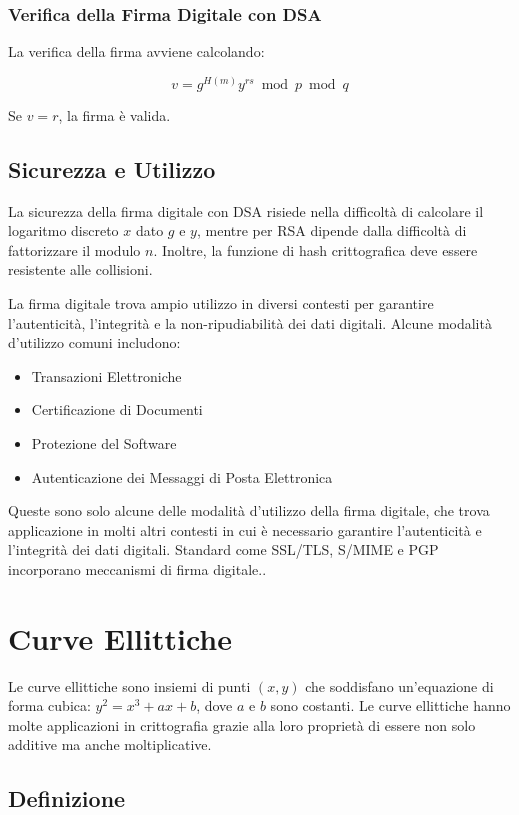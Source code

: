 \documentclass[a4paper,12pt]{report}
\begin{document}
\subsection{Verifica della Firma Digitale con DSA}
La verifica della firma avviene calcolando:

\[
v = g^{H(m)}y^{rs} \bmod p \bmod q
\]

Se $v = r$, la firma è valida.

\section{Sicurezza e Utilizzo}
La sicurezza della firma digitale con DSA risiede nella difficoltà di calcolare il logaritmo discreto $x$ dato $g$ e $y$, mentre per RSA dipende dalla difficoltà di fattorizzare il modulo $n$. Inoltre, la funzione di hash crittografica deve essere resistente alle collisioni.

La firma digitale trova ampio utilizzo in diversi contesti per garantire l'autenticità, l'integrità e la non-ripudiabilità dei dati digitali. Alcune modalità d'utilizzo comuni includono:

\begin{itemize}
    \item Transazioni Elettroniche
    \item Certificazione di Documenti
    \item Protezione del Software
    \item Autenticazione dei Messaggi di Posta Elettronica
\end{itemize}

Queste sono solo alcune delle modalità d'utilizzo della firma digitale, che trova applicazione in molti altri contesti in cui è necessario garantire l'autenticità e l'integrità dei dati digitali. Standard come SSL/TLS, S/MIME e PGP incorporano meccanismi di firma digitale..
%
%
%
%
%
%
%
%
%
%
%
%
\chapter{Curve Ellittiche}
Le curve ellittiche sono insiemi di punti $(x, y)$ che soddisfano un'equazione di forma cubica: $y^2 = x^3 + ax + b$, dove $a$ e $b$ sono costanti. Le curve ellittiche hanno molte applicazioni in crittografia grazie alla loro proprietà di essere non solo additive ma anche moltiplicative.

\section{Definizione}
\end{document}
